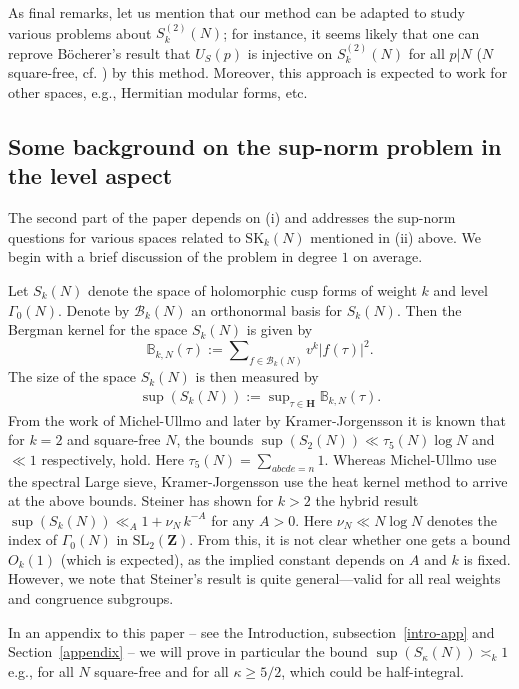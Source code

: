 \documentclass[11pt]{amsart}
\numberwithin{equation}{section}
\theoremstyle{plain}
\theoremstyle{definition}
\newcommand{\h}{\mf H}
\newcommand{\mbb}{\mathbb}
\newcommand{\mf}{\mathbf}
\newcommand{\mc}{\mathcal}
\newcommand{\mrm}{\mathrm}
\newcommand{\sumn}{\sum \nolimits}
\newcommand{\sltwo}{\mrm{SL}_2(\mf Z)}
\newcommand{\sktwon}{S_k^{(2)}(N)}
\newcommand{\skkn}{\mrm{SK}_k(N)}
\begin{document}
As final remarks, let us mention that our method can be adapted to study various problems about $\sktwon$; for instance, it seems likely that one can reprove B\"ocherer's result that $U_S(p)$ is injective on $\sktwon$ for all $p|N $ ($N$ square-free, cf. \cite{boech-Up}) by this method. Moreover, this approach is expected to work for other spaces, e.g., Hermitian modular forms, etc.

\subsection{Some background on the sup-norm problem in the level aspect}
The second part of the paper depends on (i) and addresses the sup-norm questions for various spaces related to $\skkn$ mentioned in (ii) above. We begin with a brief discussion of the problem in degree $1$ on average.

Let $S_k(N)$ denote the space of holomorphic cusp forms of weight $k$ and level $\Gamma_0(N)$. Denote by $\mc B_{k}(N)$ an orthonormal basis for $S_k(N)$. Then the Bergman kernel for the space $S_k(N)$ is given by
\begin{equation}
    \mbb B_{k,N}(\tau)    := \sumn_{f\in \mc B_{k}(N)} v^k |f(\tau)|^2.
\end{equation}
The size of the space $S_k(N)$ is then measured by
\begin{align}
    \sup(S_k(N)) := \sup \nolimits_{\tau \in \h}  \mbb B_{k,N}(\tau).
\end{align}
From the work of Michel-Ullmo \cite{michel1998points} and later by Kramer-Jorgensson \cite{jorgenson2004bounding} it is known that for $k=2$ and square-free $N$, the bounds $ \displaystyle \sup(S_2(N)) \ll \tau_5(N) \log N$ and $\ll 1$ respectively, hold. Here $\tau_5(N) = \sum_{abcde=n}1$.
Whereas Michel-Ullmo use the spectral Large sieve, Kramer-Jorgensson use the heat kernel method to arrive at the above bounds. Steiner has shown for $k>2$ the hybrid result $ \displaystyle \sup(S_k(N)) \ll_A 1+\nu_N \, k^{-A}$ for any $A>0$. Here $\nu_N \ll N \log N$ denotes the index of $\Gamma_0(N)$ in $\sltwo$. From this, it is not clear whether one gets a bound $O_k(1)$ (which is expected), as the implied constant depends on $A$ and $k$ is fixed. However, we note that Steiner's result is quite general—valid for all real weights and congruence subgroups.

In an appendix to this paper -- see the Introduction, subsection~\ref{intro-app} and Section~\ref{appendix} -- we will prove in particular the bound $\displaystyle \sup(S_\kappa(N)) \asymp_k 1$ e.g., for all $N$ square-free and for all $\kappa \ge 5/2$, which could be half-integral.
\end{document}
